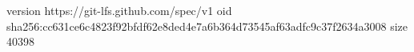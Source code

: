 version https://git-lfs.github.com/spec/v1
oid sha256:cc631ce6c4823f92bfdf62e8ded4e7a6b364d73545af63adfc9c37f2634a3008
size 40398
